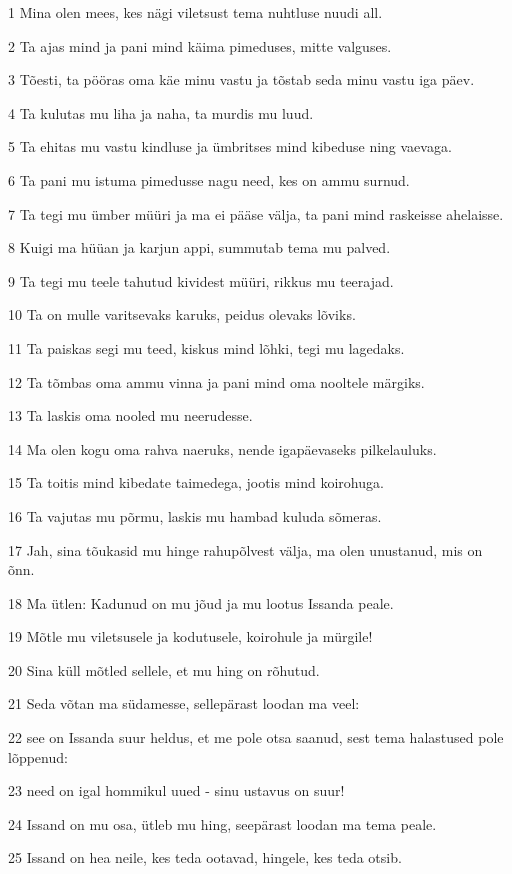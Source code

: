 \par 1 Mina olen mees, kes nägi viletsust tema nuhtluse nuudi all.
\par 2 Ta ajas mind ja pani mind käima pimeduses, mitte valguses.
\par 3 Tõesti, ta pööras oma käe minu vastu ja tõstab seda minu vastu iga päev.
\par 4 Ta kulutas mu liha ja naha, ta murdis mu luud.
\par 5 Ta ehitas mu vastu kindluse ja ümbritses mind kibeduse ning vaevaga.
\par 6 Ta pani mu istuma pimedusse nagu need, kes on ammu surnud.
\par 7 Ta tegi mu ümber müüri ja ma ei pääse välja, ta pani mind raskeisse ahelaisse.
\par 8 Kuigi ma hüüan ja karjun appi, summutab tema mu palved.
\par 9 Ta tegi mu teele tahutud kividest müüri, rikkus mu teerajad.
\par 10 Ta on mulle varitsevaks karuks, peidus olevaks lõviks.
\par 11 Ta paiskas segi mu teed, kiskus mind lõhki, tegi mu lagedaks.
\par 12 Ta tõmbas oma ammu vinna ja pani mind oma nooltele märgiks.
\par 13 Ta laskis oma nooled mu neerudesse.
\par 14 Ma olen kogu oma rahva naeruks, nende igapäevaseks pilkelauluks.
\par 15 Ta toitis mind kibedate taimedega, jootis mind koirohuga.
\par 16 Ta vajutas mu põrmu, laskis mu hambad kuluda sõmeras.
\par 17 Jah, sina tõukasid mu hinge rahupõlvest välja, ma olen unustanud, mis on õnn.
\par 18 Ma ütlen: Kadunud on mu jõud ja mu lootus Issanda peale.
\par 19 Mõtle mu viletsusele ja kodutusele, koirohule ja mürgile!
\par 20 Sina küll mõtled sellele, et mu hing on rõhutud.
\par 21 Seda võtan ma südamesse, sellepärast loodan ma veel:
\par 22 see on Issanda suur heldus, et me pole otsa saanud, sest tema halastused pole lõppenud:
\par 23 need on igal hommikul uued - sinu ustavus on suur!
\par 24 Issand on mu osa, ütleb mu hing, seepärast loodan ma tema peale.
\par 25 Issand on hea neile, kes teda ootavad, hingele, kes teda otsib.
